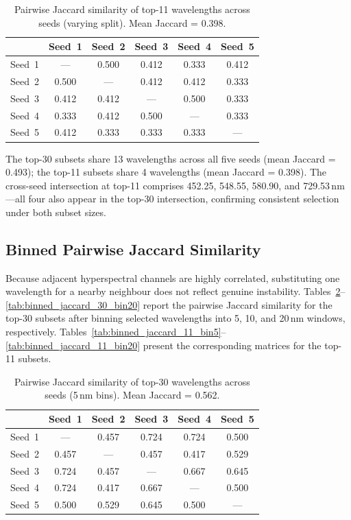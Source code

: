 \begin{table}[!htbp]
\centering
\caption[Jaccard similarity: top-11, varying split]{Pairwise Jaccard similarity of top-11 wavelengths across seeds (varying split). Mean Jaccard = 0.398.}
\label{tab:jaccard_11}
\begin{tabular}{cccccc}
\toprule
 & Seed~1 & Seed~2 & Seed~3 & Seed~4 & Seed~5 \\
\midrule
Seed~1 & ---   & 0.500 & 0.412 & 0.333 & 0.412 \\
Seed~2 & 0.500 & ---   & 0.412 & 0.412 & 0.333 \\
Seed~3 & 0.412 & 0.412 & ---   & 0.500 & 0.333 \\
Seed~4 & 0.333 & 0.412 & 0.500 & ---   & 0.333 \\
Seed~5 & 0.412 & 0.333 & 0.333 & 0.333 & ---   \\
\bottomrule
\end{tabular}
\end{table}

\noindent
The top-30 subsets share 13 wavelengths across all five seeds (mean Jaccard = 0.493); the top-11 subsets share 4 wavelengths (mean Jaccard = 0.398). The cross-seed intersection at top-11 comprises 452.25, 548.55, 580.90, and 729.53\,nm---all four also appear in the top-30 intersection, confirming consistent selection under both subset sizes.

\subsection{Binned Pairwise Jaccard Similarity}
\label{app:binned_jaccard}

\noindent
Because adjacent hyperspectral channels are highly correlated, substituting one wavelength for a nearby neighbour does not reflect genuine instability.
Tables~\ref{tab:binned_jaccard_30_bin5}--\ref{tab:binned_jaccard_30_bin20} report the pairwise Jaccard similarity for the top-30 subsets after binning selected wavelengths into 5, 10, and 20\,nm windows, respectively.
Tables~\ref{tab:binned_jaccard_11_bin5}--\ref{tab:binned_jaccard_11_bin20} present the corresponding matrices for the top-11 subsets.

\begin{table}[!htbp]
\centering
\caption[Jaccard similarity: top-30, 5\,nm bins]{Pairwise Jaccard similarity of top-30 wavelengths across seeds (5\,nm bins). Mean Jaccard = 0.562.}
\label{tab:binned_jaccard_30_bin5}
\begin{tabular}{cccccc}
\toprule
 & Seed~1 & Seed~2 & Seed~3 & Seed~4 & Seed~5 \\
\midrule
Seed~1 & ---   & 0.457 & 0.724 & 0.724 & 0.500 \\
Seed~2 & 0.457 & ---   & 0.457 & 0.417 & 0.529 \\
Seed~3 & 0.724 & 0.457 & ---   & 0.667 & 0.645 \\
Seed~4 & 0.724 & 0.417 & 0.667 & ---   & 0.500 \\
Seed~5 & 0.500 & 0.529 & 0.645 & 0.500 & ---   \\
\bottomrule
\end{tabular}
\end{table}

